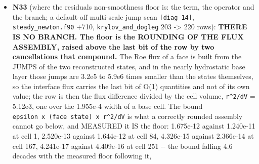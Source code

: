 \documentclass[english,a4paper]{my_memo}
\begin{document}
\begin{itemize}
  the flux assembly, not in \texttt{ionization\_equilibrium.f90} -\/- the candidates
  left are the reconstruction where the limiter is not the frozen WENO3
  weight, the Riemann wave-speed estimate, \texttt{Apply\_BC}, and the transport
  coefficients of the diffusion operator, which are the one remaining way
  the composition reaches a hydrodynamic row. Advisor: rebuild on \texttt{build\_lwv}; \texttt{krylov\_and\_dogleg} 203/0, \texttt{steady\_species\_rows} 194/0, \texttt{adv\_static\_limit} 53/0, \texttt{residual\_determinism} the same single row FAIL by design; atomic reload at cap 40 with every hook off, 8 threads: the N31 ladder to the digit (1.888, 1.891, 1.819, 1.583, 1.861, 8.964e-1, 7.607e-2; handed back 5.377e-2, spread 3.555e-3), so the worker\textquotesingle s 1.112 at iteration 40 is the thread-count sensitivity of N26c, not a change of the path. The atomic fixture README now states the triplet is on and which branch that selects; \texttt{newton\_dense}\textquotesingle s hardcoded step test recorded in ISSUES 3.7. Accepted; deliverable 2 correctly not built. \textbf{Next item N33}: the jump itself, scanned along the Arnoldi direction across four arcs and split by term and operator (base boundary, reconstruction, Riemann flux, caloric inversion, composition read, transport sources).
\item
  \textbf{N33} (where the residual\textquotesingle s non-smoothness floor is: the term, the
  operator and the branch; a default-off multi-scale jump scan
  \texttt{{[}diag\ 14{]}}, \texttt{steady\_newton.f90} +710, \texttt{krylov\_and\_dogleg} 203 -\textgreater{} 220
  rows): \textbf{THERE IS NO BRANCH. The floor is the ROUNDING OF THE FLUX
  ASSEMBLY, raised above the last bit of the row by two cancellations
  that compound.} The Roe flux of a face is built from the JUMPS of the
  two reconstructed states, and in the nearly hydrostatic base layer
  those jumps are 3.2e5 to 5.9e6 times smaller than the states
  themselves, so the interface flux carries the last bit of O(1)
  quantities and not of its own value; the row is then the flux
  difference divided by the cell volume, \texttt{r\^{}2/dV} = 5.12e3, one over the
  1.955e-4 width of a base cell. The bound
  \texttt{epsilon\ x\ (face\ state)\ x\ r\^{}2/dV} is what a correctly rounded assembly
  cannot go below, and MEASURED it IS the floor: 1.675e-12 against
  1.240e-11 at cell 1, 2.520e-13 against 1.644e-12 at cell 84, 4.326e-15
  against 2.366e-14 at cell 167, 4.241e-17 against 4.409e-16 at cell 251
  -\/- the bound falling 4.6 decades with the measured floor following it,

\end{itemize}
\end{document}
